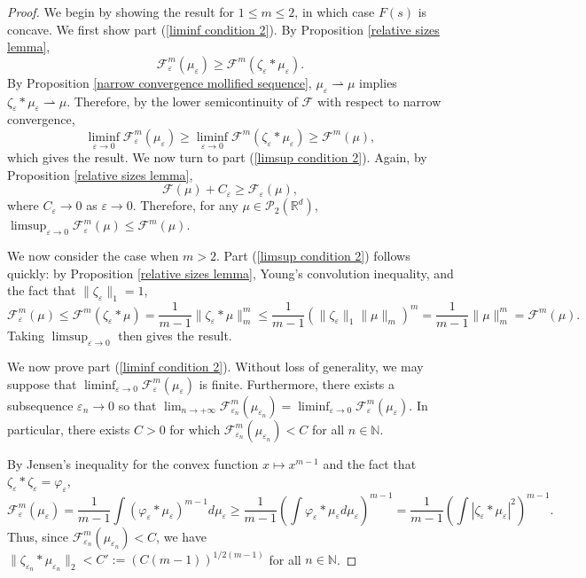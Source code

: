 \documentclass[11pt,leqno]{amsart}
\theoremstyle{definition}
\newcommand{\Rd}{{\mathord{\mathbb R}^d}}
\newcommand{\F}{\mathcal{F}}
\def\P{{\mathcal P}}
\def\e{\varepsilon}
\def\F{\mathcal{F}}
\begin{document}
\begin{proof}
We begin by showing the result for $1 \leq m \leq 2$, in which case $F(s)$ is concave. 
We first show part (\ref{liminf condition 2}). By Proposition \ref{relative sizes lemma},
\[ \F^m_\e(\mu_\e) \geq \F^m(\zeta_\e* \mu_\e) . \]
By Proposition \ref{narrow convergence mollified sequence},  $ \mu_\e \rightharpoonup \mu$ implies $\zeta_\e* \mu_\e\rightharpoonup \mu$. Therefore,  by the lower semicontinuity of $\F$ with respect to narrow convergence,
\[ \liminf_{\e \to 0} \F^m_\e(\mu_\e) \geq  \liminf_{\e \to 0}  \F^m(\zeta_\e* \mu_\e) \geq \F^m(\mu) , \]
which gives the result.
We now turn to part (\ref{limsup condition 2}). Again, by Proposition \ref{relative sizes lemma},
\[ \F(\mu) + C_\e \geq \F_\e(\mu) , \]
where $C_\e \to 0$ as $\e \to 0$.
Therefore, for any $\mu \in \P_2(\Rd)$,  $\limsup_{\e \to 0} \F^m_\e(\mu) \leq \F^m(\mu)$.

We now consider the case when $m>2$. Part (\ref{limsup condition 2}) follows quickly: by Proposition \ref{relative sizes lemma}, Young's convolution inequality, and the fact that $ \|\zeta_\e\|_1 = 1$,
\[ \F^m_\e(\mu) \leq \F^m(\zeta_\e *\mu) = \frac{1}{m-1} \|\zeta_\e*\mu\|_m^m \leq \frac{1}{m-1} ( \|\zeta_\e\|_1 \|\mu\|_m)^m =\frac{1}{m-1}  \|\mu\|_m^m   = \F^m(\mu).\]
Taking $\limsup_{\e \to 0}$ then gives the result.

We now prove part (\ref{liminf condition 2}). Without loss of generality, we may suppose that $\liminf_{\e \to 0} \mathcal{F}^m_\e(\mu_\e)$ is finite. Furthermore, there exists a subsequence $\e_n \to 0$ so that $\lim_{n \to + \infty} \mathcal{F}_{\e_n}^m(\mu_{\e_n}) = \liminf_{\e \to 0} \mathcal{F}^m_\e(\mu_\e)$. In particular, there exists $C>0$ for which $\F^m_{\e_n}(\mu_{\e_n})  < C$ for all $n \in \mathbb{N}$.

By Jensen's inequality for the convex function $x \mapsto x^{m-1}$ and the fact that $\zeta_\e * \zeta_\e = \varphi_\e$,
\[ \F^m_\e(\mu_\e)= \frac{1}{m-1} \int (\varphi_\e * \mu_\e)^{m-1} d \mu_\e \geq \frac{1}{m-1} \left( \int \varphi_\e * \mu_\e d \mu_\e \right)^{m-1} = \frac{1}{m-1} \left( \int |\zeta_\e*\mu_\e|^2 \right)^{m-1} .\]
Thus, since $\F^m_{\e_n}(\mu_{\e_n})  < C$, we have $\|\zeta_{\e_n}*\mu_{\e_n}\|_2< C':= (C(m-1))^{1/2(m-1)}$ for all $n \in \mathbb{N}$.


\end{proof}
\end{document}
